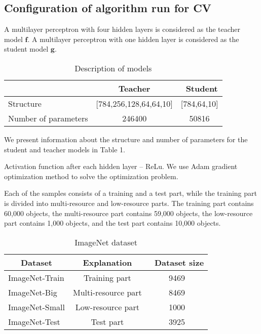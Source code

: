 \documentclass[12pt]{article}
\begin{document}
\subsection{Configuration of algorithm run for CV}
A multilayer perceptron with four hidden layers is considered as the teacher model $\textbf{f}$. A multilayer perceptron with one hidden layer is considered as the student model $\textbf{g}$.
\begin{table}[h!t]
\begin{center}
\caption{Description of models}
\label{table_1}
\begin{tabular}{|c|c|c|}
\hline
	 & Teacher &\ Student\\
	\hline
	\multicolumn{1}{|l|}{Structure}
	& [784,256,128,64,64,10]& [784,64,10]\\
	\hline
	\multicolumn{1}{|l|}{Number of parameters}
	& 246400 & 50816\\
\hline

\end{tabular}
\end{center}
\end{table}

We present information about the structure and number of parameters for the student and teacher models in Table 1.

Activation function after each hidden layer -- ReLu. 
We use Adam gradient optimization method \citep{Adam} to solve the optimization problem.

Each of the samples consists of a training and a test part, while the training part is divided into multi-resource and low-resource parts. The training part contains 60,000 objects, the multi-resource part contains 59,000 objects, the low-resource part contains 1,000 objects, and the test part contains 10,000 objects.

\begin{table}[h!t]
\begin{center}
\caption{ImageNet dataset}
\label{table_10}
\begin{tabular}{|c|c|c|}
\hline
	Dataset & Explanation &\ Dataset size\\
	\hline
	\multicolumn{1}{|l|}{ImageNet-Train}
	& Training part& 9469\\
	\hline
	\multicolumn{1}{|l|}{ImageNet-Big}
	& Multi-resource part& 8469\\
	\hline
	\multicolumn{1}{|l|}{ImageNet-Small}
	& Low-resource part& 1000\\
	\hline
	\multicolumn{1}{|l|}{ImageNet-Test}
	& Test part& 3925\\
\hline
\end{tabular}
\end{center}
\end{table}
\end{document}
